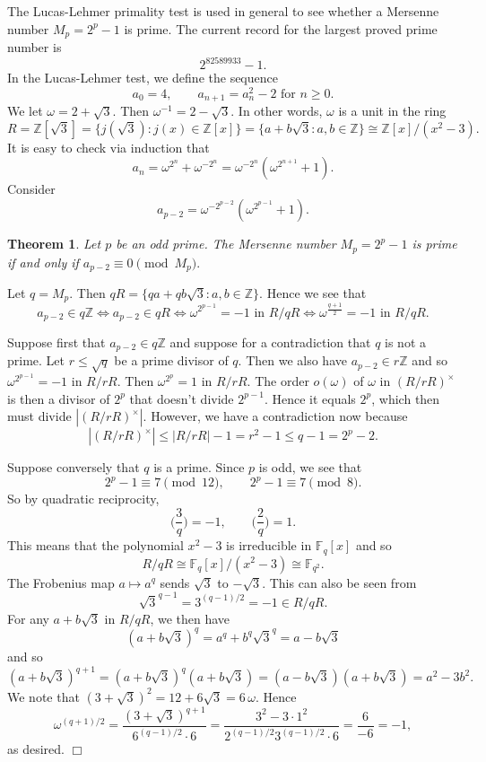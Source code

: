 \documentclass{article}
\def\Z{{\mathbb Z}}
\def\F{{\mathbb F}}
\def\Z{{\mathbb Z}}
\def\F{{\mathbb F}}
\newtheorem{theorem}[subsection]{Theorem}
\newenvironment{proof}{\noindent {\bf Proof:}}{$\Box$ \vspace{2 ex}}
\renewcommand{\lg}[2]{\Big(\frac{#1}{#2}\Big)}
\begin{document}
The Lucas-Lehmer primality test is used in general to see whether a Mersenne number $M_p = 2^p - 1$ is prime. The current record for the largest proved prime number is $$2^{82589933} - 1.$$  In the Lucas-Lehmer test, we define the sequence
$$a_0 = 4,\qquad a_{n+1} = a_n^2 - 2\mbox{ for }n\geq 0.$$
We let $\omega = 2 + \sqrt{3}$. Then $\omega^{-1} = 2 - \sqrt{3}$. In other words, $\omega$ is a unit in the ring $$R = \Z[\sqrt{3}] = \{j(\sqrt{3})\colon j(x)\in \Z[x]\} = \{a + b\sqrt{3}\colon a,b\in\Z\} \cong \Z[x]/(x^2 - 3).$$
It is easy to check via induction that $$a_n = \omega^{2^n} + \omega^{-2^n} = \omega^{-2^n}(\omega^{2^{n+1}}+1).$$
Consider $$a_{p-2} = \omega^{-2^{p-2}}(\omega^{2^{p-1}}+1).$$

\begin{theorem}
    Let $p$ be an odd prime. The Mersenne number $M_p = 2^p - 1$ is prime if and only if $a_{p-2}\equiv 0\pmod{M_p}.$
\end{theorem}

\begin{proof}
    Let $q = M_p$. Then $qR = \{qa + qb\sqrt{3}\colon a,b\in\Z\}.$ Hence we see that
    $$a_{p-2}\in q\Z \Longleftrightarrow a_{p-2} \in qR \Longleftrightarrow \omega^{2^{p-1}}=-1\mbox{ in }R/qR \Longleftrightarrow\omega^{\frac{q+1}{2}}=-1\mbox{ in }R/qR.$$

    Suppose first that $a_{p-2}\in q\Z$ and suppose for a contradiction that $q$ is not a prime. Let $r \leq \sqrt{q}$ be a prime divisor of $q$. Then we also have $a_{p-2} \in r\Z$ and so $\omega^{2^{p-1}}=-1$ in $R/rR.$ Then $\omega^{2^p} = 1$ in $R/rR$. The order $o(\omega)$ of $\omega$ in $(R/rR)^\times$ is then a divisor of $2^p$ that doesn't divide $2^{p-1}$. Hence it equals $2^p$, which then must divide $|(R/rR)^\times|$. However, we have a contradiction now because $$|(R/rR)^\times| \leq |R/rR| - 1 = r^2 - 1 \leq q - 1 = 2^p - 2.$$

    Suppose conversely that $q$ is a prime. Since $p$ is odd, we see that $$2^p - 1\equiv 7\pmod{12},\qquad 2^p - 1\equiv 7\pmod{8}.$$
    So by quadratic reciprocity,
    $$\lg{3}{q} = -1,\qquad \lg{2}{q} = 1.$$
    This means that the polynomial $x^2 - 3$ is irreducible in $\F_q[x]$ and so $$R/qR \cong \F_q[x]/(x^2 - 3) \cong\F_{q^2}.$$ The Frobenius map $a\mapsto a^q$ sends $\sqrt{3}$ to $-\sqrt{3}$. This can also be seen from $$\sqrt{3}^{q-1} = 3^{(q-1)/2} = -1 \in R/qR.$$
    For any $a + b\sqrt{3}$ in $R/qR$, we then have
    $$(a + b\sqrt{3})^q = a^q + b^q\sqrt{3}^q = a - b\sqrt{3}$$
    and so
    $$(a + b\sqrt{3})^{q+1} = (a + b\sqrt{3})^q (a + b\sqrt{3}) = (a - b\sqrt{3})(a + b\sqrt{3}) = a^2 - 3b^2.$$
    We note that $(3 + \sqrt{3})^2 = 12 + 6\sqrt{3} = 6\,\omega$. Hence
    $$\omega^{(q+1)/2} = \frac{(3 + \sqrt{3})^{q+1}}{6^{(q-1)/2}\cdot 6} = \frac{3^2 - 3\cdot 1^2}{2^{(q-1)/2}3^{(q-1)/2}\cdot 6} = \frac{6}{-6} = -1,$$
    as desired.
\end{proof}
\end{document}
